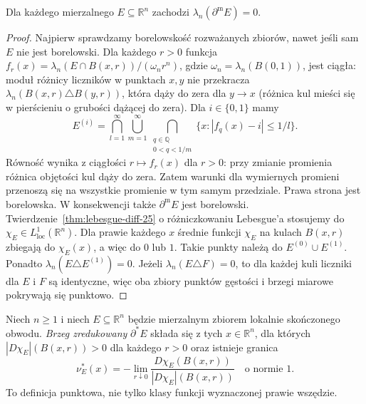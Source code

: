 \begin{lemat}
\label{lem:essential-boundary-null-29}
Dla każdego mierzalnego $E\subseteq\mathbb R^n$
zachodzi $\lambda_n(\partial^{\mathrm m}E)=0$.
\end{lemat}
\begin{proof}
Najpierw sprawdzamy borelowskość rozważanych zbiorów,
nawet jeśli sam $E$ nie jest borelowski.
Dla każdego $r>0$ funkcja
$f_r(x)=\lambda_n(E\cap B(x,r))/(\omega_n r^n)$,
gdzie $\omega_n=\lambda_n(B(0,1))$, jest ciągła:
moduł różnicy liczników w punktach $x,y$ nie
przekracza $\lambda_n(B(x,r)\triangle B(y,r))$,
która dąży do zera dla $y\to x$ (różnica kul
mieści się w pierścieniu o grubości dążącej do zera).
Dla $i\in\{0,1\}$ mamy
\[
 E^{(i)}=\bigcap_{l=1}^\infty\bigcup_{m=1}^\infty
 \bigcap_{\substack{q\in\mathbb Q\\0<q<1/m}}
 \{x:|f_q(x)-i|\le1/l\}.
\]
Równość wynika z ciągłości $r\mapsto f_r(x)$
dla $r>0$: przy zmianie promienia różnica objętości
kul dąży do zera. Zatem warunki dla wymiernych
promieni przenoszą się na wszystkie promienie
w tym samym przedziale. Prawa strona jest borelowska.
W konsekwencji także $\partial^{\mathrm m}E$
jest borelowski.
Twierdzenie~\ref{thm:lebesgue-diff-25} o różniczkowaniu
Lebesgue'a stosujemy do
$\chi_E\in L^1_{\mathrm{loc}}(\mathbb R^n)$.
Dla prawie każdego $x$ średnie funkcji $\chi_E$
na kulach $B(x,r)$ zbiegają do $\chi_E(x)$,
a więc do $0$ lub $1$. Takie punkty należą
do $E^{(0)}\cup E^{(1)}$. Ponadto
$\lambda_n(E\triangle E^{(1)})=0$.
Jeżeli $\lambda_n(E\triangle F)=0$, to dla każdej
kuli liczniki dla $E$ i $F$ są identyczne, więc
oba zbiory punktów gęstości i brzegi miarowe
pokrywają się punktowo.
\end{proof}

\begin{definicja}
\label{def:reduced-boundary-29}
Niech $n\ge1$ i niech $E\subseteq\mathbb R^n$
będzie mierzalnym zbiorem lokalnie skończonego obwodu.
\emph{Brzeg zredukowany} $\partial^*E$ składa się
z tych $x\in\mathbb R^n$, dla których
$|D\chi_E|(B(x,r))>0$ dla każdego $r>0$
oraz istnieje granica
\[
 \nu_E^*(x)=-\lim_{r\downarrow0}
 \frac{D\chi_E(B(x,r))}{|D\chi_E|(B(x,r))}
 \quad\text{o normie }1.
\]
To definicja punktowa, nie tylko klasy funkcji
wyznaczonej prawie wszędzie.
\end{definicja}

